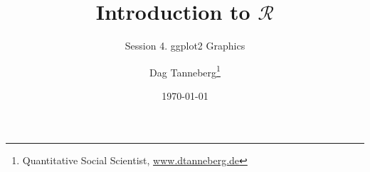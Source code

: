 \usepackage[utf8]{inputenc}
\usepackage{hyperref}
\usepackage{graphicx}
\usepackage{booktabs}

\title{Introduction to $\mathcal{R}$}
\subtitle{Session 4. ggplot2 Graphics}
\author{Dag Tanneberg\thanks{%
    Quantitative Social Scientist,
    \href{http://www.dtanneberg.de}{www.dtanneberg.de}
  }
}
\date{\today}
\hypersetup{colorlinks, urlcolor = red, linkcolor = }
